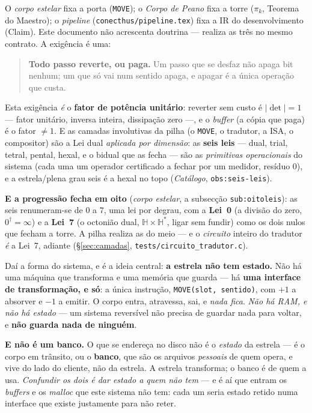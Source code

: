 \documentclass[11pt,a4paper]{article}
\newcommand{\code}[1]{\texttt{\small #1}}
\newcommand{\dg}{^{\dagger}}
\begin{document}
O \emph{corpo estelar} fixa a porta (\code{MOVE}); o \emph{Corpo de Peano}
fixa a torre ($\pi_k$, Teorema do Maestro); o \emph{pipeline}
(\code{conecthus/pipeline.tex}) fixa a IR do desenvolvimento
(\textsf{Claim}). Este documento não acrescenta doutrina --- realiza as três
no mesmo contrato.
A exigência é uma:

\begin{quote}
\textbf{Todo passo reverte, ou paga.} Um passo que se desfaz não apaga bit nenhum; um que só vai
num sentido apaga, e apagar é a única operação que custa.
\end{quote}

\noindent Esta exigência \emph{é} o \textbf{fator de potência unitário}: reverter sem custo é
$|\det|=1$ --- fator unitário, inversa inteira, dissipação zero ---, e o \emph{buffer} (a cópia que
paga) é o fator $\neq1$. E as camadas involutivas da pilha (o \code{MOVE}, o tradutor, a ISA, o
compositor) são a Lei dual \emph{aplicada por dimensão}: as \textbf{seis leis} --- dual, trial, tetral,
pental, hexal, e o bidual que as fecha --- são as \emph{primitivas operacionais} do sistema (cada uma
um operador certificado a fechar por um medidor, resíduo $0$), e a estrela/plena grau seis é a hexal no
topo (\emph{Catálogo}, \code{obs:seis-leis}).

\smallskip
\noindent \textbf{E a progressão fecha em oito} (\emph{corpo estelar}, a subsecção \code{sub:oitoleis}):
as seis renumeram-se de $0$ a $7$, uma lei por degrau, com a \textbf{Lei~0} (a divisão do zero,
$0\dg=\infty$) e a \textbf{Lei~7} (o octonião dual, $\mathbb{H}\times\mathbb{H}^{*}$, ligar sem fundir)
como os dois nulos que fecham a torre. A pilha realiza as do meio --- e o \emph{circuito} inteiro do
tradutor \emph{é} a Lei~7, adiante (\S\ref{sec:camadas}, \code{tests/circuito\_tradutor.c}).

\noindent Daí a forma do sistema, e é a ideia central: \textbf{a estrela não tem estado.} Não há uma
máquina que transforma e uma memória que guarda --- há \textbf{uma interface de transformação, e só}:
a única instrução, \code{MOVE(slot, sentido)}, com $+1$ a absorver e $-1$ a emitir. O corpo entra,
atravessa, sai, e \emph{nada fica}. \emph{Não há RAM, e não há estado} --- um sistema reversível não
precisa de guardar nada para voltar, e \textbf{não guarda nada de ninguém}.

\smallskip
\noindent \textbf{E não é um banco.} O que se endereça no disco não é o \emph{estado} da estrela ---
é o corpo em trânsito, ou o \textbf{banco}, que são os arquivos \emph{pessoais} de quem opera, e vive
do lado do cliente, não da estrela. A estrela transforma; o banco é de quem a usa. \emph{Confundir os
dois é dar estado a quem não tem} --- e é aí que entram os \emph{buffers} e os \emph{malloc} que este
sistema não tem: cada um seria estado retido numa interface que existe justamente para não reter.
\end{document}
